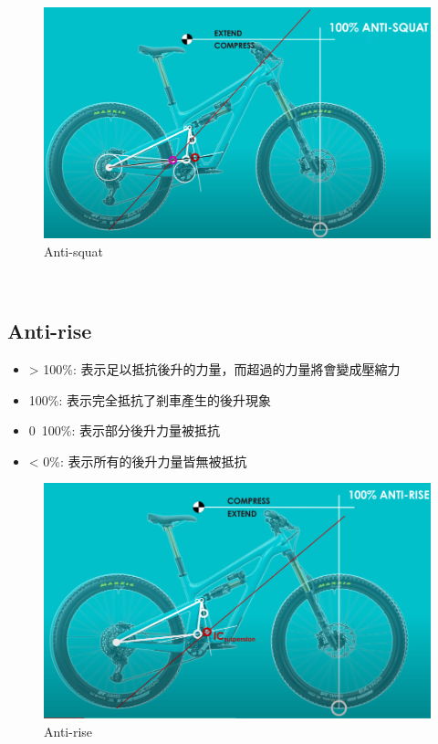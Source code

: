 \documentclass[14pt,a4paper]{report}  %
\newcommand{\fourteen}{\fontsize{14pt}{\baselineskip}\selectfont}%
\begin{document}
{     \begin{figure}[hbt!]
       \centering
       \includegraphics[scale=0.4]{anti-squat.PNG}
       \caption{Anti-squat}
       \label{fig_anti-squat:scale}
    \end{figure}
       
       \hspace*{\fill} \\
       \subsection{Anti-rise}
       \fourteen {在剎車的時候因為力量轉移的關係導致後輪產生升起的情況，而Anti-rise即為抵抗此後升現象的能力。}
       \begin{itemize}
       \item > 100\%: 表示足以抵抗後升的力量，而超過的力量將會變成壓縮力
       \item 100\%: 表示完全抵抗了剎車產生的後升現象
       \item 0~100\%: 表示部分後升力量被抵抗
       \item < 0\%: 表示所有的後升力量皆無被抵抗
       \end{itemize}
	\begin{figure}[hbt!]
       \centering
       \includegraphics[scale=0.45]{anti-rise.PNG}
       \caption{Anti-rise}
       \label{fig_anti-rise:scale}
    \end{figure}
       
}
\end{document}
